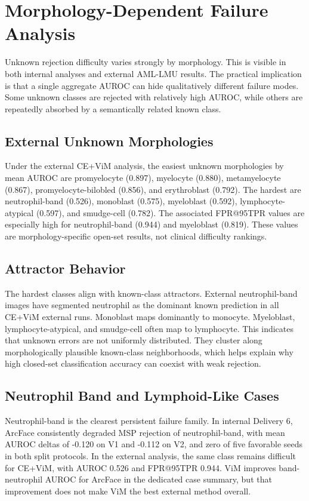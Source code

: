 \section{Morphology-Dependent Failure Analysis}

Unknown rejection difficulty varies strongly by morphology. This is visible in both internal analyses and external AML-LMU results. The practical implication is that a single aggregate AUROC can hide qualitatively different failure modes. Some unknown classes are rejected with relatively high AUROC, while others are repeatedly absorbed by a semantically related known class.

\subsection{External Unknown Morphologies}

Under the external CE+ViM analysis, the easiest unknown morphologies by mean AUROC are promyelocyte (0.897), myelocyte (0.880), metamyelocyte (0.867), promyelocyte-bilobled (0.856), and erythroblast (0.792). The hardest are neutrophil-band (0.526), monoblast (0.575), myeloblast (0.592), lymphocyte-atypical (0.597), and smudge-cell (0.782). The associated FPR@95TPR values are especially high for neutrophil-band (0.944) and myeloblast (0.819). These values are morphology-specific open-set results, not clinical difficulty rankings.

\subsection{Attractor Behavior}

The hardest classes align with known-class attractors. External neutrophil-band images have segmented neutrophil as the dominant known prediction in all CE+ViM external runs. Monoblast maps dominantly to monocyte. Myeloblast, lymphocyte-atypical, and smudge-cell often map to lymphocyte. This indicates that unknown errors are not uniformly distributed. They cluster along morphologically plausible known-class neighborhoods, which helps explain why high closed-set classification accuracy can coexist with weak rejection.

\subsection{Neutrophil Band and Lymphoid-Like Cases}

Neutrophil-band is the clearest persistent failure family. In internal Delivery 6, ArcFace consistently degraded MSP rejection of neutrophil-band, with mean AUROC deltas of -0.120 on V1 and -0.112 on V2, and zero of five favorable seeds in both split protocols. In the external analysis, the same class remains difficult for CE+ViM, with AUROC 0.526 and FPR@95TPR 0.944. ViM improves band-neutrophil AUROC for ArcFace in the dedicated case summary, but that improvement does not make ViM the best external method overall.

